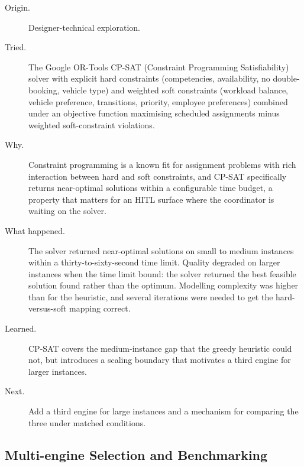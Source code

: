 \begin{description}
  \item[Origin.] Designer-technical exploration.
  \item[Tried.] The Google OR-Tools CP-SAT (Constraint Programming Satisfiability) solver with explicit hard constraints (competencies, availability, no double-booking, vehicle type) and weighted soft constraints (workload balance, vehicle preference, transitions, priority, employee preferences) combined under an objective function maximising scheduled assignments minus weighted soft-constraint violations.
  \item[Why.] Constraint programming is a known fit for assignment problems with rich interaction between hard and soft constraints, and CP-SAT specifically returns near-optimal solutions within a configurable time budget, a property that matters for an HITL surface where the coordinator is waiting on the solver.
  \item[What happened.] The solver returned near-optimal solutions on small to medium instances within a thirty-to-sixty-second time limit. Quality degraded on larger instances when the time limit bound: the solver returned the best feasible solution found rather than the optimum. Modelling complexity was higher than for the heuristic, and several iterations were needed to get the hard-versus-soft mapping correct.
  \item[Learned.] CP-SAT covers the medium-instance gap that the greedy heuristic could not, but introduces a scaling boundary that motivates a third engine for larger instances.
  \item[Next.] Add a third engine for large instances and a mechanism for comparing the three under matched conditions.
\end{description}

\subsection{Multi-engine Selection and Benchmarking}
\label{sec:iter-multiengine}

